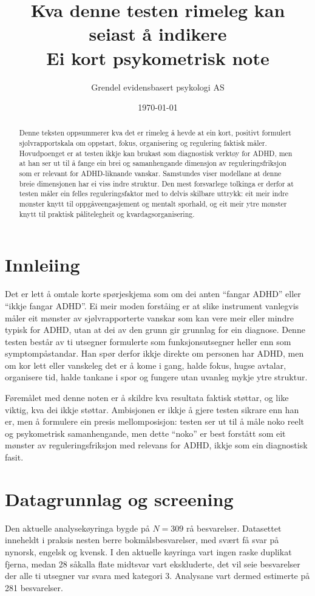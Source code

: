 \documentclass[11pt,a4paper]{article}
\title{Kva denne testen rimeleg kan seiast å indikere\\
\large Ei kort psykometrisk note}
\author{Grendel evidensbasert psykologi AS}
\date{\today}
\begin{document}
\maketitle

\begin{abstract}
Denne teksten oppsummerer kva det er rimeleg å hevde at ein kort, positivt formulert sjølvrapportskala om oppstart, fokus, organisering og regulering faktisk måler. Hovudpoenget er at testen ikkje kan brukast som diagnostisk verktøy for ADHD, men at han ser ut til å fange ein brei og samanhengande dimensjon av reguleringsfriksjon som er relevant for ADHD-liknande vanskar. Samstundes viser modellane at denne breie dimensjonen har ei viss indre struktur. Den mest forsvarlege tolkinga er derfor at testen måler ein felles reguleringsfaktor med to delvis skilbare uttrykk: eit meir indre mønster knytt til oppgåveengasjement og mentalt sporhald, og eit meir ytre mønster knytt til praktisk pålitelegheit og kvardagsorganisering.
\end{abstract}

\section{Innleiing}
Det er lett å omtale korte spørjeskjema som om dei anten ``fangar ADHD'' eller ``ikkje fangar ADHD''. Ei meir moden forståing er at slike instrument vanlegvis måler eit mønster av sjølvrapporterte vanskar som kan vere meir eller mindre typisk for ADHD, utan at dei av den grunn gir grunnlag for ein diagnose. Denne testen består av ti utsegner formulerte som funksjonsutsegner heller enn som symptompåstandar. Han spør derfor ikkje direkte om personen har ADHD, men om kor lett eller vanskeleg det er å kome i gang, halde fokus, hugse avtalar, organisere tid, halde tankane i spor og fungere utan uvanleg mykje ytre struktur.

Føremålet med denne noten er å skildre kva resultata faktisk støttar, og like viktig, kva dei ikkje støttar. Ambisjonen er ikkje å gjere testen sikrare enn han er, men å formulere ein presis mellomposisjon: testen ser ut til å måle noko reelt og psykometrisk samanhengande, men dette ``noko'' er best forstått som eit mønster av reguleringsfriksjon med relevans for ADHD, ikkje som ein diagnostisk fasit.

\section{Datagrunnlag og screening}
Den aktuelle analysekøyringa bygde på $N = 309$ rå besvarelser. Datasettet inneheldt i praksis nesten berre bokmålsbesvarelser, med svært få svar på nynorsk, engelsk og kvensk. I den aktuelle køyringa vart ingen raske duplikat fjerna, medan 28 såkalla flate midtsvar vart ekskluderte, det vil seie besvarelser der alle ti utsegner var svara med kategori 3. Analysane vart dermed estimerte på 281 besvarelser.
\end{document}
